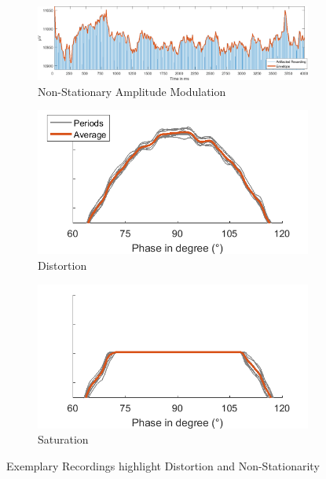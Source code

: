 \documentclass[a4paper]{article}
\begin{document}
\begin{figure}[hbtp]
    \begin{subfigure}{1\textwidth}
    \includegraphics[width=\textwidth]{./img/intro/nonstationarity.png}
    \caption{Non-Stationary Amplitude Modulation}\label{fig:nonstationary}
    \end{subfigure}

    \begin{subfigure}{.5\textwidth}
    \includegraphics[width=\textwidth]{./img/intro/distortion.png}
    \caption{Distortion}\label{fig:distortion}
    \end{subfigure}
    \begin{subfigure}{.5\textwidth}
    \includegraphics[width=\textwidth]{./img/intro/saturation.png}
    \caption{Saturation}\label{fig:saturation}
    \end{subfigure}

    \caption{Exemplary Recordings highlight Distortion and Non-Stationarity}\label{fig:nonsinus}
\end{figure}
\end{document}
